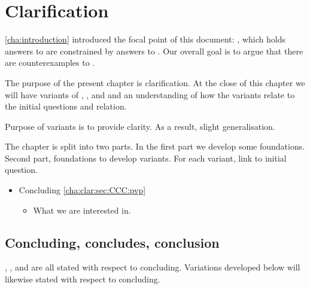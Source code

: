 \chapter{Clarification}
\label{cha:clar}

\begin{note}
  \autoref{cha:introduction} introduced the focal point of this document:
  \issueInclusion{}, which holds answers to \qWhy{} are constrained by answers to \qHow{}.
  Our overall goal is to argue that there are counterexamples to \issueInclusion{}.

  The purpose of the present chapter is clarification.
  At the close of this chapter we will have variants of \qWhy{}, \qHow{}, and \issueInclusion{} and an understanding of how the variants relate to the initial questions and relation.

  Purpose of variants is to provide clarity.
  As a result, slight generalisation.
\end{note}

\begin{note}
  The chapter is split into two parts.
  In the first part we develop some foundations.
  Second part, foundations to develop variants.
  For each variant, link to initial question.

  \begin{itemize}
  \item
    Concluding \hfill \autoref{cha:clar:sec:CCC:pvp}
    \begin{itemize}
    \item
      What we are interested in.
    \end{itemize}
  \end{itemize}
\end{note}

\section{Concluding, concludes, conclusion}
\label{cha:clar:sec:CCC}

\begin{note}
  \qWhy{}, \qHow{}, and \issueInclusion{} are all stated with respect to concluding.
  Variations developed below will likewise stated with respect to concluding.
\end{note}

